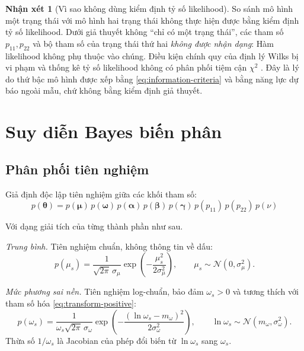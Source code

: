 \documentclass[12pt,a4paper]{article}
\numberwithin{equation}{section}
\theoremstyle{definition}
\newtheorem{remark}{Nhận xét}[section]
\newcommand{\Param}{\symbf{\theta}}
\newcommand{\bmgamma}{\symbf{\gamma}}
\begin{document}
	\begin{remark}[Vì sao không dùng kiểm định tỷ số likelihood]\label{rem:lr-test}
		So sánh mô hình một trạng thái với mô hình hai trạng thái không thực hiện được bằng kiểm
		định tỷ số likelihood. Dưới giả thuyết không ``chỉ có một trạng thái'', các tham số
		$p_{11},p_{22}$ và bộ tham số của trạng thái thứ hai \emph{không được nhận dạng}: Hàm
		likelihood không phụ thuộc vào chúng. Điều kiện chính quy của định lý Wilks bị vi phạm và
		thống kê tỷ số likelihood không có phân phối tiệm cận $\chi^{2}$
		\cite{davies1987,hansen1992}. Đây là lý do thứ bậc mô hình được xếp bằng
		\eqref{eq:information-criteria} và bằng năng lực dự báo ngoài mẫu, chứ không bằng kiểm
		định giả thuyết.
	\end{remark}
	
	\section{Suy diễn Bayes biến phân}\label{sec:vb}
	
	\subsection{Phân phối tiên nghiệm}\label{subsec:priors}
	Giả định độc lập tiên nghiệm giữa các khối tham số:
	$$p(\Param)=p(\symbf\mu)\,p(\symbf\omega)\,p(\symbf\alpha)\,p(\symbf\beta)\,p(\bmgamma)\,p(p_{11})\,p(p_{22})\,p(\nu)$$
	
	Với dạng giải tích của từng thành phần như sau.
	
	\emph{Trung bình.} Tiên nghiệm chuẩn, không thông tin về dấu:
	\begin{equation}
		p(\mu_s)=\frac{1}{\sqrt{2\pi}\,\sigma_\mu}
		\exp\!\left(-\frac{\mu_s^{2}}{2\sigma_\mu^{2}}\right),
		\qquad \mu_s\sim\mathcal{N}\!\left(0,\sigma_\mu^{2}\right).
		\label{eq:prior-mu}
	\end{equation}
	
	\emph{Mức phương sai nền.} Tiên nghiệm log-chuẩn, bảo đảm $\omega_s>0$ và tương thích với
	tham số hóa \eqref{eq:transform-positive}:
	\begin{equation}
		p(\omega_s)=\frac{1}{\omega_s\sqrt{2\pi}\,\sigma_\omega}
		\exp\!\left(-\frac{\left(\ln\omega_s-m_\omega\right)^{2}}{2\sigma_\omega^{2}}\right),
		\qquad \ln\omega_s\sim\mathcal{N}\!\left(m_\omega,\sigma_\omega^{2}\right).
		\label{eq:prior-omega}
	\end{equation}
	Thừa số $1/\omega_s$ là Jacobian của phép đổi biến từ $\ln\omega_s$ sang $\omega_s$.
	
\end{document}

